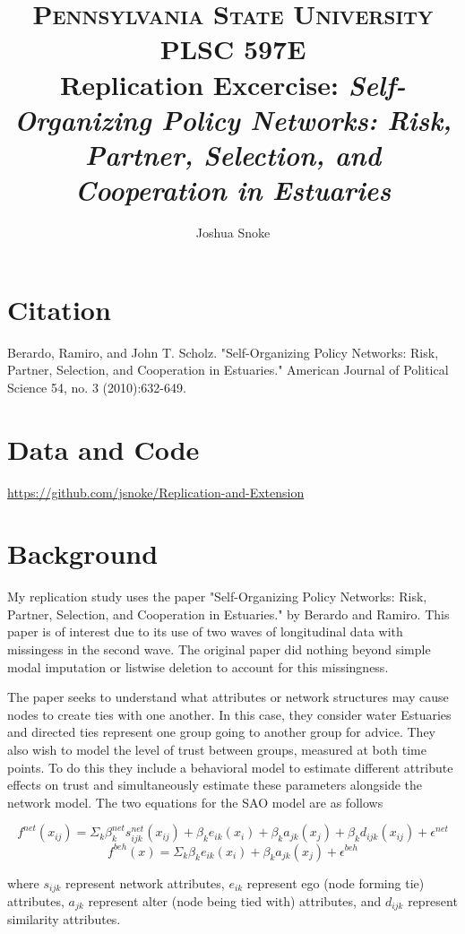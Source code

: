 \documentclass[12pt]{article} %
\title{
		\usefont{OT1}{bch}{b}{n}
		\normalfont \normalsize \textsc{Pennsylvania State University} \\ [25pt]
            \normalfont \normalsize \textsc{PLSC 597E} \\ [25pt]
		\Large Replication Excercise: \textit{Self-Organizing Policy Networks: Risk, Partner, Selection, and Cooperation in Estuaries} \\
}
\author{
		\normalfont 								\normalsize
        Joshua Snoke \\[-2pt]		\normalsize
}
\date{}
\numberwithin{equation}{section}		%
\numberwithin{figure}{section}			%
\numberwithin{table}{section}				%
\begin{document}
\maketitle

\section*{Citation}
Berardo, Ramiro, and John T. Scholz. "Self-Organizing Policy Networks: Risk, Partner, Selection, and Cooperation in Estuaries." American Journal of Political Science 54, no. 3 (2010):632-649.

\section*{Data and Code}
\url{https://github.com/jsnoke/Replication-and-Extension}

\section{Background}
My replication study uses the paper "Self-Organizing Policy Networks: Risk, Partner, Selection, and Cooperation in Estuaries." by Berardo and Ramiro. This paper is of interest due to its use of two waves of longitudinal data with missingess in the second wave. The original paper did nothing beyond simple modal imputation or listwise deletion to account for this missingness.

The paper seeks to understand what attributes or network structures may cause nodes to create ties with one another. In this case, they consider water Estuaries and directed ties represent one group going to another group for advice. They also wish to model the level of trust between groups, measured at both time points. To do this they include a behavioral model to estimate different attribute effects on trust and simultaneously estimate these parameters alongside the network model. The two equations for the SAO model are as follows

\begin{equation}
f^{net}(x_{ij}) = \Sigma_k \beta_k^{net} s^{net}_{ijk}(x_{ij}) + \beta_k e_{ik}(x_i) + \beta_k a_{jk}(x_{j}) + \beta_k d_{ijk}(x_{ij}) + \epsilon^{net}
\end{equation}
\begin{equation}
f^{beh}(x) = \Sigma_k \beta_k e_{ik}(x_i) + \beta_k a_{jk}(x_{j}) + \epsilon^{beh}
\end{equation}

where $s_{ijk}$ represent network attributes, $e_{ik}$ represent ego (node forming tie) attributes, $a_{jk}$ represent alter (node being tied with) attributes, and $d_{ijk}$ represent similarity attributes.
\end{document}
